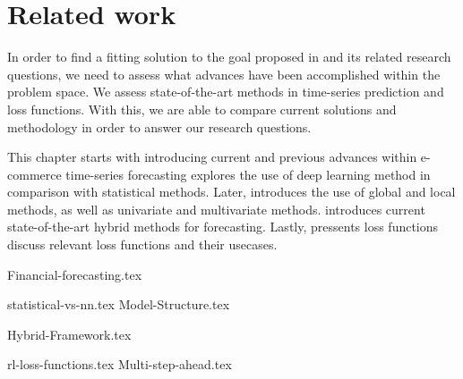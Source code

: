 \chapter{Related work}
\label{section:RelatedWork}

In order to find a fitting solution to the goal proposed in  and its related research questions,
we need to assess what advances have been accomplished within the problem space.
We assess state-of-the-art methods in time-series prediction and loss functions.
With this, we are able to compare current solutions and methodology in order to answer our research questions.

This chapter starts with  introducing current and previous advances within e-commerce time-series forecasting
 explores the use of deep learning method in comparison with statistical methods.
Later,  introduces the use of global and local methods, as well as univariate and multivariate methods.
 introduces current state-of-the-art hybrid methods for forecasting.
Lastly,  pressents loss functions discuss relevant loss functions and their usecases.



{Financial-forecasting.tex}

{statistical-vs-nn.tex}
{Model-Structure.tex}

{Hybrid-Framework.tex}

{rl-loss-functions.tex}
{Multi-step-ahead.tex}
